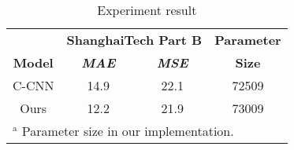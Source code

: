 \begin{table}[htbp]
\caption{\label{tab:experiment-result}  Experiment result}
\begin{center}
\begin{tabular}{|c|c|c|c|}
\hline
\textbf{}&\multicolumn{2}{|c|}{\textbf{ShanghaiTech Part B}}&\textbf{Parameter} \\
\cline{1-3}
\textbf{Model} & \textbf{\textit{MAE}}& \textbf{\textit{MSE}}&\textbf{Size} \\
\hline
C-CNN & 14.9 & 22.1 & 72509   \\
\hline
Ours & 12.2 & 21.9 & 73009 \\
\hline
\multicolumn{4}{l}{$^{\mathrm{a}}$ Parameter size in our implementation.}
\end{tabular}

\end{center}
\end{table}